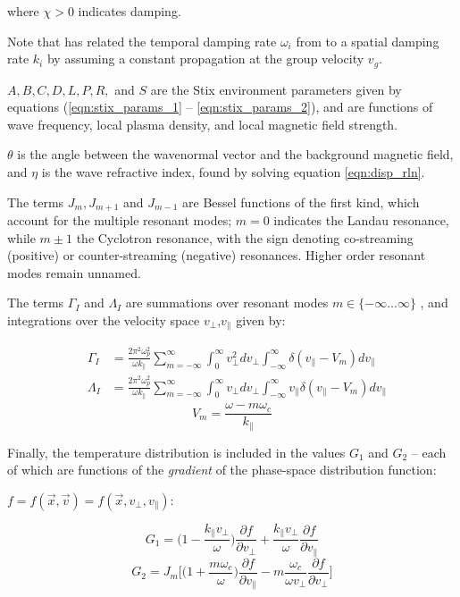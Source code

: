 where $\chi > 0$ indicates damping.

Note that \citeauthor{Brinca1972} has related the temporal damping rate $\omega_i$ from \cite{Kennel1966} to a spatial damping rate $k_i$ by assuming a constant propagation at the group velocity $v_g$.

$A, B, C, D, L, P, R,$ and $S$ are the Stix environment parameters given by equations (\ref{eqn:stix_params_1} -- \ref{eqn:stix_params_2}), and are functions of wave frequency, local plasma density, and local magnetic field strength. 

$\theta$ is the angle between the wavenormal vector and the background magnetic field, and $\eta$ is the wave refractive index, found by solving equation \eqref{eqn:disp_rln}.

The terms $J_m, J_{m+1}$ and $J_{m-1}$ are Bessel functions of the first kind, which account for the multiple resonant modes; $m=0$ indicates the Landau resonance, while $m\pm1$ the Cyclotron resonance, with the sign denoting co-streaming (positive) or counter-streaming (negative) resonances. Higher order resonant modes remain unnamed. 

The terms $\Gamma_I$ and $\Lambda_I$ are summations over resonant modes $m\in \{-\infty...\infty\}$ , and integrations over the velocity space $v_\perp$,$v_\parallel$ given by:

\begin{eqnarray}
&\Gamma_I &= \frac{2\pi^2\omega_p^2}{\omega k_\parallel} \sum_{m=-\infty}^{\infty}\int_0^\infty v_\perp^2 dv_\perp \int_{-\infty}^\infty \delta(v_\parallel - V_m) d v_\parallel \\
&\Lambda_I &= \frac{2\pi^2\omega_p^2}{\omega k_\parallel} \sum_{m=-\infty}^{\infty}\int_0^\infty v_\perp dv_\perp \int_{-\infty}^\infty v_\parallel \delta(v_\parallel - V_m) d v_\parallel
\end{eqnarray}
\begin{equation}
V_m = \frac{\omega - m\omega_c}{k_\parallel}
\end{equation}

Finally, the temperature distribution is included in the values $G_1$ and $G_2$ -- each of which are functions of the \emph{gradient} of the phase-space distribution function:

 $f=f(\vec{x}, \vec{v}) = f(\vec{x}, v_\perp, v_\parallel)$:

\begin{equation}
G_1 = \bigg(1 - \frac{k_\parallel v_\perp}{\omega}\bigg)\frac{\partial f}{\partial v_\perp} + \frac{k_\parallel v_\perp}{\omega}\frac{\partial f}{\partial v_\parallel}
\end{equation}
\begin{equation}
G_2 = J_m\bigg[\bigg(1 + \frac{m \omega_c}{\omega}\bigg)\frac{\partial f}{\partial v_\parallel} - m \frac{\omega_c}{\omega v_\perp} \frac{\partial f}{\partial v_\perp}\bigg]
\end{equation}

